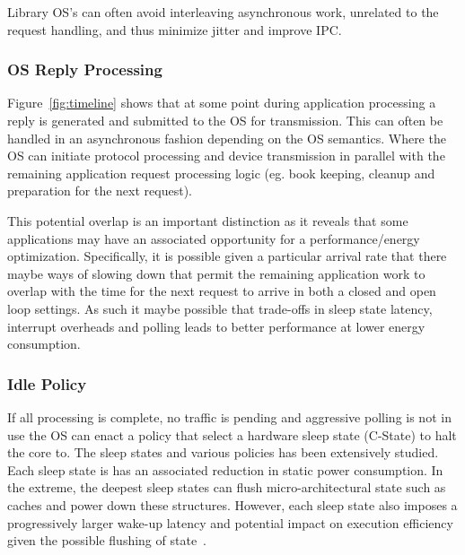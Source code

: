 Library OS's can often avoid interleaving asynchronous work, unrelated to the request handling,  and thus minimize jitter and improve IPC. %

\subsubsection{OS Reply Processing}
\label{sec:workflow:osrepproc}

Figure~\ref{fig:timeline} shows that at some point during application processing a reply is generated and submitted to the OS for transmission.  This can often be handled in an asynchronous fashion depending on the OS semantics.  Where the OS can initiate protocol processing and device transmission in parallel with the remaining application request processing logic (eg. book keeping, cleanup and preparation for the next request).

This potential overlap is an important distinction as it reveals that some applications may have an associated opportunity for a performance/energy optimization.  Specifically, it is possible given a particular arrival rate that there maybe ways of slowing down that permit the remaining application work to overlap with the time for the next request to arrive in both a closed and open loop settings.  As such it maybe possible that trade-offs in sleep state latency, interrupt overheads and polling leads to better performance at lower energy consumption.  

\subsubsection{Idle Policy}
\label{sec:workflow:idlepolicy}

If all processing is complete, no traffic is pending and aggressive polling is not in use the OS can enact a policy that select a hardware sleep state (C-State) to halt the core to.  The sleep states and various policies has been extensively studied\cite{dynsleep,dreamweaver,slowdownorsleep}.  Each sleep state is has an associated reduction in static power consumption. In the extreme, the deepest sleep states can flush micro-architectural state such as caches and power down these structures. However, each sleep state also imposes a progressively larger wake-up latency and potential impact on execution efficiency given the possible flushing of state~\cite{7425206}. %

